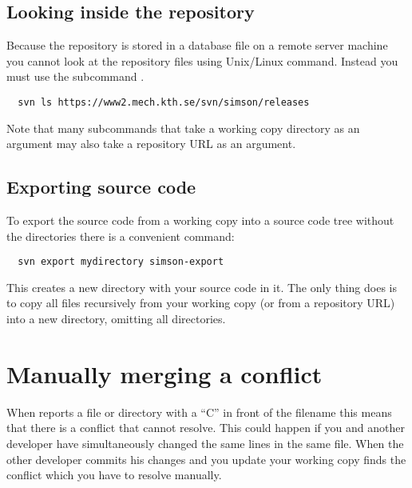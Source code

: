 \documentclass[10pt,a4paper]{simson}
\begin{document}
\subsection{Looking inside the repository}
Because the  repository is stored in a database file
on a remote server machine you cannot look at the repository files
using Unix/Linux  command. Instead you must use the
 subcommand .
\begin{verbatim}
  svn ls https://www2.mech.kth.se/svn/simson/releases
\end{verbatim}
Note that many  subcommands that take a working copy
directory as an argument may also take a repository URL as an
argument.


\subsection{Exporting source code}
To export the source code from a 
working copy into a source code tree without the 
directories there is a convenient command:
\begin{verbatim}
  svn export mydirectory simson-export
\end{verbatim}
This creates a new directory  with your source
code in it. The only thing  does is to copy all files
recursively from your working copy (or from a repository URL) into a
new directory, omitting all  directories.


\section{Manually merging a conflict}
When  reports a file or directory with a ``C'' in
front of the filename this means that there is a conflict that
 cannot resolve. This could happen if you and
another developer have simultaneously changed the same lines in the
same file. When the other developer commits his changes and you update
your working copy  finds the conflict which you have
to resolve manually.
\end{document}
